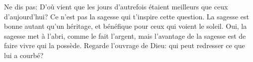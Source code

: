 Ne dis pas: D’où vient que les jours d’autrefois
		étaient meilleurs que ceux d’aujourd’hui?
	Ce n’est pas la sagesse qui t’inspire cette question.
La sagesse est bonne autant qu’un héritage,
	et bénéfique pour ceux qui voient le soleil.
Oui, la sagesse met à l’abri, comme le fait l’argent,
	mais l’avantage de la sagesse est de faire vivre qui la possède.
Regarde l’ouvrage de Dieu:
	qui peut redresser ce que lui a courbé?
